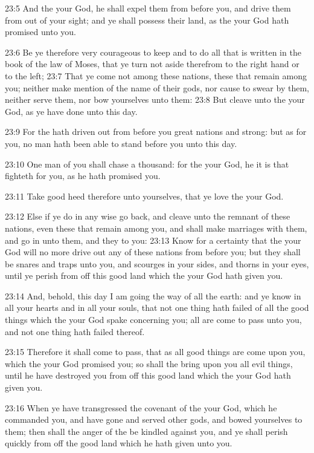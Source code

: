 23:5 And the \LORD your God, he shall expel them from before you, and drive them from out of your sight; and ye shall possess their land, as the \LORD your God hath promised unto you.

23:6 Be ye therefore very courageous to keep and to do all that is written in the book of the law of Moses, that ye turn not aside therefrom to the right hand or to the left; 23:7 That ye come not among these nations, these that remain among you; neither make mention of the name of their gods, nor cause to swear by them, neither serve them, nor bow yourselves unto them: 23:8 But cleave unto the \LORD your God, as ye have done unto this day.

23:9 For the \LORD hath driven out from before you great nations and strong: but as for you, no man hath been able to stand before you unto this day.

23:10 One man of you shall chase a thousand: for the \LORD your God, he it is that fighteth for you, as he hath promised you.

23:11 Take good heed therefore unto yourselves, that ye love the \LORD your God.

23:12 Else if ye do in any wise go back, and cleave unto the remnant of these nations, even these that remain among you, and shall make marriages with them, and go in unto them, and they to you: 23:13 Know for a certainty that the \LORD your God will no more drive out any of these nations from before you; but they shall be snares and traps unto you, and scourges in your sides, and thorns in your eyes, until ye perish from off this good land which the \LORD your God hath given you.

23:14 And, behold, this day I am going the way of all the earth: and ye know in all your hearts and in all your souls, that not one thing hath failed of all the good things which the \LORD your God spake concerning you; all are come to pass unto you, and not one thing hath failed thereof.

23:15 Therefore it shall come to pass, that as all good things are come upon you, which the \LORD your God promised you; so shall the \LORD bring upon you all evil things, until he have destroyed you from off this good land which the \LORD your God hath given you.

23:16 When ye have transgressed the covenant of the \LORD your God, which he commanded you, and have gone and served other gods, and bowed yourselves to them; then shall the anger of the \LORD be kindled against you, and ye shall perish quickly from off the good land which he hath given unto you.


